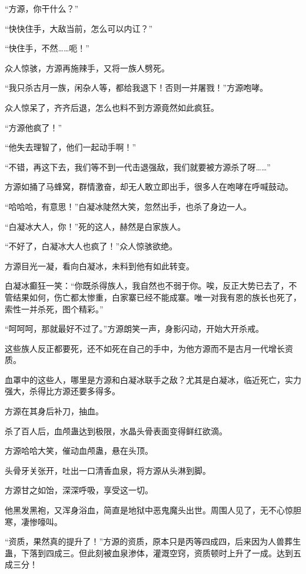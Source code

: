 
\begin{this_body}

“方源，你干什么？”

“快快住手，大敌当前，怎么可以内讧？”

“快住手，不然……呃！”

众人惊骇，方源再施辣手，又将一族人劈死。

“我只杀古月一族，闲杂人等，都给我退下！否则一并屠戮！”方源咆哮。

众人惊呆了，齐齐后退，怎么也料不到方源竟然如此疯狂。

“方源他疯了！”

“他失去理智了，他们一起动手啊！”

“不错，再这下去，我们等不到一代击退强敌，我们就要被方源杀了呀……”

方源如捅了马蜂窝，群情激奋，却无人敢立即出手，很多人在咆哮在呼喊鼓动。

“哈哈哈，有意思！”白凝冰陡然大笑，忽然出手，也杀了身边一人。

“白凝冰大人，你！”死的这人，赫然是白家族人。

“不好了，白凝冰大人也疯了！”众人惊骇欲绝。

方源目光一凝，看向白凝冰，未料到他有如此转变。

白凝冰癫狂一笑：“你既杀得族人，我自然也不弱于你。唉，反正大势已去了，不管结果如何，伤亡都太惨重，白家寨已经不能成寨。唯一对我有恩的族长也死了，索性一并杀死，图个精彩。”

“呵呵呵，那就最好不过了。”方源朗笑一声，身影闪动，开始大开杀戒。

这些族人反正都要死，还不如死在自己的手中，为他方源而不是古月一代增长资质。

血罩中的这些人，哪里是方源和白凝冰联手之敌？尤其是白凝冰，临近死亡，实力强大，杀得比方源还要多得多。

方源在其身后补刀，抽血。

杀了百人后，血颅蛊达到极限，水晶头骨表面变得鲜红欲滴。

方源哈哈大笑，催动血颅蛊，悬在头顶。

头骨牙关张开，吐出一口清香血泉，将方源从头淋到脚。

方源甘之如饴，深深呼吸，享受这一切。

他黑发黑袍，又浑身浴血，简直是地狱中恶鬼魔头出世。周围人见了，无不心惊胆寒，凄惨嚎叫。

“资质，果然真的提升了！”方源的资质，原本只是丙等四成四，后来因为人兽葬生蛊，下落到四成三。但此刻被血泉渗体，灌溉空窍，资质顿时上升了一成。达到五成三分！


\end{this_body}

